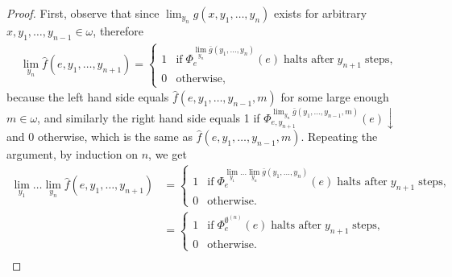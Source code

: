 \documentclass{article}
\begin{document}
\begin{enumerate}[label={\bf Q\arabic*:}]
\begin{proof}
      First, observe that since $\lim_{y_n}
      \hat{g}(x,y_1,\ldots,y_n)$ exists for arbitrary
      $x,y_1,\ldots,y_{n-1}\in\omega$, therefore
      \begin{align*}
        \lim_{y_n} \hat{f}(e,y_1,\ldots,y_{n+1}) =
        \begin{cases}
          1 &\text{if}\; \Phi_e^{\lim_{y_n} \bar{g}(y_1,\ldots,y_n)} (e)\;
            \text{halts after}\; y_{n+1}\; \text{steps},\\
          0 &\text{otherwise},
        \end{cases}
      \end{align*}
      because the left hand side equals $\hat{f}(e,y_1,\ldots,y_{n-1},m)$
      for some large enough $m\in\omega$, and similarly the right hand
      side equals 1 if $\Phi_{e,y_{n+1}}^{\lim_{y_n}
      \bar{g}(y_1,\ldots,y_{n-1},m)}(e)\downarrow$ and 0 otherwise, which
      is the same as $\hat{f}(e,y_1,\ldots,y_{n-1},m)$. Repeating the
      argument, by induction on $n$, we get
      \begin{align*}
        \lim_{y_1}\ldots\lim_{y_n} \hat{f}(e,y_1,\ldots,y_{n+1}) &=
        \begin{cases}
          1 &\text{if}\; \Phi_e^{\lim_{y_1}\ldots\lim_{y_n}
            \bar{g}(y_1,\ldots,y_n)} (e)\; \text{halts after}\; y_{n+1}\;
            \text{steps},\\
          0 &\text{otherwise}.
        \end{cases}\\
        &=
        \begin{cases}
          1 &\text{if}\; \Phi_e^{\emptyset^{(n)}} (e)\; \text{halts
            after}\; y_{n+1}\; \text{steps},\\
          0 &\text{otherwise}.
        \end{cases}\\
      \end{align*}


\end{proof}
\end{enumerate}
\end{document}
